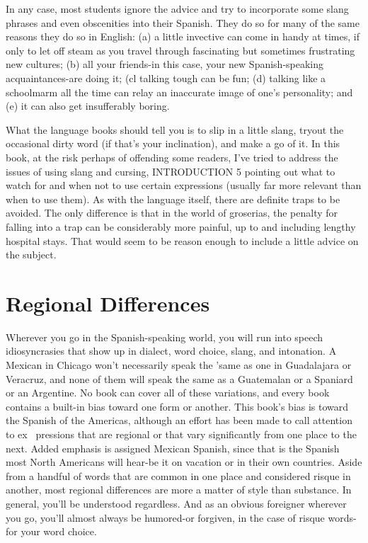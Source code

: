 In any case, most students ignore the advice and try to incorporate some slang phrases and even obscenities into their Spanish.
They do so for many of the same reasons they do so in English: (a) a
little invective can come in handy at times, if only to let off steam as
you travel through fascinating but sometimes frustrating new cultures;
(b) all your friends-in this case, your new Spanish-speaking acquaintances-are doing it; (cl talking tough can be fun; (d) talking like a
schoolmarm all the time can relay an inaccurate image of one's personality; and (e) it can also get insufferably boring.

What the language books should tell you is to slip in a little
slang, tryout the occasional dirty word (if that's your inclination), and
make a go of it. In this book, at the risk perhaps of offending some
readers, I've tried to address the issues of using slang and cursing,
INTRODUCTION 5
pointing out what to watch for and when not to use certain expressions (usually far more relevant than when to use them). As with the
language itself, there are definite traps to be avoided. The only difference is that in the world of groserias, the penalty for falling into a trap
can be considerably more painful, up to and including lengthy hospital
stays. That would seem to be reason enough to include a little advice
on the subject.

\section{Regional Differences}

Wherever you go in the Spanish-speaking world, you will run
into speech idiosyncrasies that show up in dialect, word choice, slang,
and intonation. A Mexican in Chicago won't necessarily speak the
'same as one in Guadalajara or Veracruz, and none of them will speak
the same as a Guatemalan or a Spaniard or an Argentine. No book can
cover all of these variations, and every book contains a built-in bias
toward one form or another. This book's bias is toward the Spanish of
the Americas, although an effort has been made to call attention to ex~
pressions that are regional or that vary significantly from one place to
the next. Added emphasis is assigned Mexican Spanish, since that is
the Spanish most North Americans will hear-be it on vacation or in
their own countries. Aside from a handful of words that are common
in one place and considered risque in another, most regional differences are more a matter of style than substance. In general, you'll be
understood regardless. And as an obvious foreigner wherever you go,
you'll almost always be humored-or forgiven, in the case of risque
words-for your word choice.

